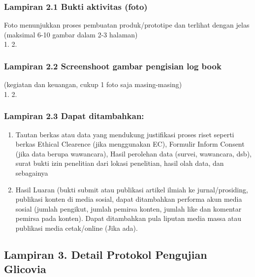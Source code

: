 \documentclass[12pt,a4paper]{article}
\begin{document}
\subsubsection*{Lampiran 2.1 Bukti aktivitas (foto)}
Foto menunjukkan proses pembuatan produk/prototipe dan terlihat dengan jelas (maksimal 6-10 gambar dalam 2-3 halaman)\\
1. 2.

\subsubsection*{Lampiran 2.2 Screenshoot gambar pengisian log book}
(kegiatan dan keuangan, cukup 1 foto saja masing-masing)\\
1. 2.

\subsubsection*{Lampiran 2.3 Dapat ditambahkan:}
\begin{enumerate}
    \item Tautan berkas atau data yang mendukung justifikasi proses riset seperti berkas Ethical Clearence (jika menggunakan EC), Formulir Inform Consent (jika data berupa wawancara), Hasil perolehan data (survei, wawancara, dsb), surat bukti izin penelitian dari lokasi penelitian, hasil olah data, dan sebagainya
    \item Hasil Luaran (bukti submit atau publikasi artikel ilmiah ke jurnal/prosiding, publikasi konten di media sosial, dapat ditambahkan performa akun media sosial (jumlah pengikut, jumlah pemirsa konten, jumlah like dan komentar pemirsa pada konten). Dapat ditambahkan pula liputan media massa atau publikasi media cetak/online (Jika ada).
\end{enumerate}

\subsection*{Lampiran 3. Detail Protokol Pengujian Glicovia}
\end{document}
